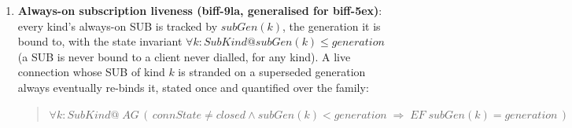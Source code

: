 \documentclass[a4paper,10pt,fleqn]{article}
\begin{document}
\begin{enumerate}
  \item \textbf{Always-on subscription liveness (biff-9la, generalised
    for biff-5ex)}: every kind's always-on SUB is tracked by
    $subGen(k)$, the generation it is bound to, with the state invariant
    $\forall k : SubKind @ subGen(k) \leq generation$ (a SUB is never
    bound to a client never dialled, for any kind).  A live connection
    whose SUB of kind $k$ is stranded on a superseded generation always
    eventually re-binds it, stated once and quantified over the family:

    \begin{quote}
      $\forall k : SubKind @\;
      AG\,(\,connState \neq closed \land subGen(k) < generation
      \;\Rightarrow\; EF\;subGen(k) = generation\,)$
    \end{quote}


\end{enumerate}
\end{document}
